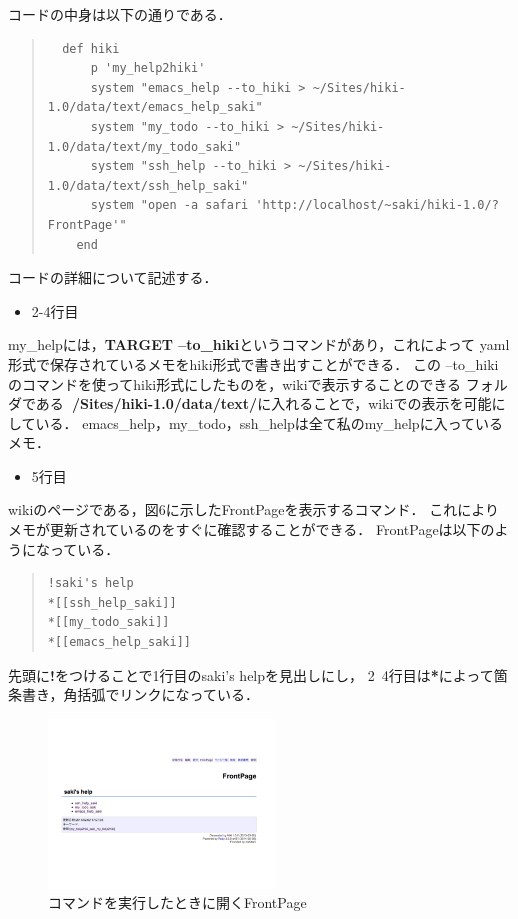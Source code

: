 コードの中身は以下の通りである．
\begin{quote}\begin{verbatim}
  def hiki
      p 'my_help2hiki'
      system "emacs_help --to_hiki > ~/Sites/hiki-1.0/data/text/emacs_help_saki"
      system "my_todo --to_hiki > ~/Sites/hiki-1.0/data/text/my_todo_saki"
      system "ssh_help --to_hiki > ~/Sites/hiki-1.0/data/text/ssh_help_saki"
      system "open -a safari 'http://localhost/~saki/hiki-1.0/?FrontPage'"
    end
\end{verbatim}\end{quote}
\newpage
コードの詳細について記述する．
\begin{itemize}
\item 2-4行目
\end{itemize}
\begin{description}
\item my\_helpには，\textbf{TARGET --to\_hiki}というコマンドがあり，これによって
yaml形式で保存されているメモをhiki形式で書き出すことができる．
この --to\_hiki のコマンドを使ってhiki形式にしたものを，wikiで表示することのできる
フォルダである\textbf{~/Sites/hiki-1.0/data/text/}に入れることで，wikiでの表示を可能にしている．
emacs\_help，my\_todo，ssh\_helpは全て私のmy\_helpに入っているメモ．
\end{description}

\begin{itemize}
\item 5行目
\end{itemize}
\begin{description}
\item wikiのページである，図6に示したFrontPageを表示するコマンド．
これによりメモが更新されているのをすぐに確認することができる．
FrontPageは以下のようになっている．
\end{description}
\begin{quote}\begin{verbatim}
!saki's help
*[[ssh_help_saki]]
*[[my_todo_saki]]
*[[emacs_help_saki]]
\end{verbatim}\end{quote}
\begin{description}
\item 先頭に\textbf{!}をつけることで1行目のsaki's helpを見出しにし，
2~4行目は\textbf{*}によって箇条書き，角括弧でリンクになっている．
\end{description}

\begin{figure}[htbp]\begin{center}
\includegraphics[clip,width=6cm,bb=100 100 600 550]{my_help2hiki_saki.002.png}
\caption{コマンドを実行したときに開くFrontPage }
\label{default}\end{center}\end{figure}

